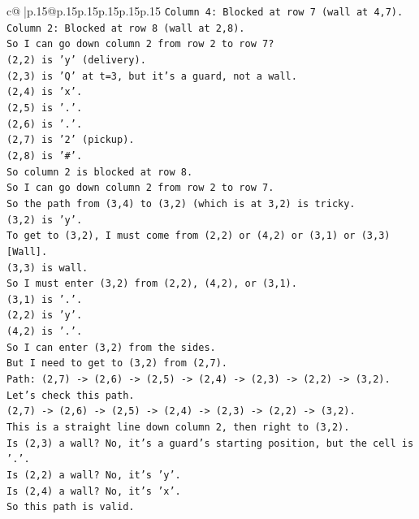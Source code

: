 \documentclass{article}
\begin{document}
{\begin{supertabular}{c@{$\;$}|p{.15\linewidth}@{}p{.15\linewidth}p{.15\linewidth}p{.15\linewidth}p{.15\linewidth}p{.15\linewidth}}
{{{\texttt{Column 4: Blocked at row 7 (wall at 4,7).} \\
\texttt{Column 2: Blocked at row 8 (wall at 2,8).} \\
\texttt{So I can go down column 2 from row 2 to row 7?} \\
\texttt{(2,2) is 'y' (delivery).} \\
\texttt{(2,3) is 'Q' at t=3, but it's a guard, not a wall.} \\
\texttt{(2,4) is 'x'.} \\
\texttt{(2,5) is '.'.} \\
\texttt{(2,6) is '.'.} \\
\texttt{(2,7) is '2' (pickup).} \\
\texttt{(2,8) is '\#'.} \\
\texttt{So column 2 is blocked at row 8.} \\
\texttt{So I can go down column 2 from row 2 to row 7.} \\
\texttt{So the path from (3,4) to (3,2) (which is at 3,2) is tricky.} \\
\texttt{(3,2) is 'y'.} \\
\texttt{To get to (3,2), I must come from (2,2) or (4,2) or (3,1) or (3,3){[}Wall{]}.} \\
\texttt{(3,3) is wall.} \\
\texttt{So I must enter (3,2) from (2,2), (4,2), or (3,1).} \\
\texttt{(3,1) is '.'.} \\
\texttt{(2,2) is 'y'.} \\
\texttt{(4,2) is '.'.} \\
\texttt{So I can enter (3,2) from the sides.} \\
\texttt{But I need to get to (3,2) from (2,7).} \\
\texttt{Path: (2,7) {-}> (2,6) {-}> (2,5) {-}> (2,4) {-}> (2,3) {-}> (2,2) {-}> (3,2).} \\
\texttt{Let's check this path.} \\
\texttt{(2,7) {-}> (2,6) {-}> (2,5) {-}> (2,4) {-}> (2,3) {-}> (2,2) {-}> (3,2).} \\
\texttt{This is a straight line down column 2, then right to (3,2).} \\
\texttt{Is (2,3) a wall? No, it's a guard's starting position, but the cell is '.'.} \\
\texttt{Is (2,2) a wall? No, it's 'y'.} \\
\texttt{Is (2,4) a wall? No, it's 'x'.} \\
\texttt{So this path is valid.} \\
}}}
\end{supertabular}}
\end{document}
